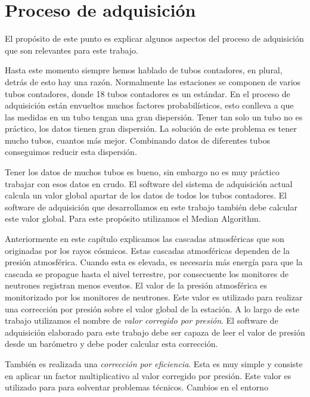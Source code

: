 \section{Proceso de adquisición}
	El propósito de este punto es explicar algunos aspectos del proceso de adquisición que son relevantes para este trabajo.
	\begin{description}[leftmargin=0cm]
		\item[Múltiples Tubos]
		  	Hasta este momento siempre hemos hablado de tubos contadores, en plural, detrás de esto hay una razón. Normalmente las
			estaciones se componen de varios tubos contadores, donde 18 tubos contadores es un estándar. En el proceso de adquisición
			están envueltos muchos factores probabilísticos, esto conlleva a que las medidas en un tubo tengan una gran dispersión. Tener
			tan solo un tubo no es práctico, los datos tienen gran dispersión. La solución de este problema es tener mucho tubos, cuantos
			más mejor. Combinando datos de diferentes tubos conseguimos reducir esta dispersión. 
		\item[Valor global]
			Tener los datos de muchos tubos es bueno, sin embargo no es muy práctico trabajar con esos datos en crudo. El software del
			sistema de adquisición actual calcula un valor global apartar de los datos de todos los tubos contadores. El software de
			adquisición que desarrollamos en este trabajo también debe calcular este valor global. Para este propósito utilizamos el
			Median Algorithm\cite{MedianAlgr}.
		\item[Correcciónes]
			Anteriormente en este capítulo explicamos las cascadas atmosféricas que son originadas por los rayos cósmicos. Estas cascadas
			atmosféricas dependen de la presión atmosférica. Cuando esta es elevada, es necesaria más energía para que la cascada se
			propague hasta el nivel terrestre, por consecuente los monitores de neutrones registran menos eventos. El valor de la presión
			atmosférica es monitorizado por los monitores de neutrones. Este valor es utilizado para realizar una corrección por presión
			sobre el valor global de la estación. A lo largo de este trabajo utilizamos el nombre de \emph{valor corregido por presión}.
			El software de adquisición elaborado para este trabajo debe ser capaza de leer el valor de presión desde un barómetro y debe
			poder calcular esta corrección. 
			\par
			También es realizada una \emph{corrección por eficiencia}. Esta es muy simple y consiste en aplicar un factor multiplicativo
			al valor corregido por presión. Este valor es utilizado para para solventar problemas técnicos. Cambios en el entorno

\end{description}
